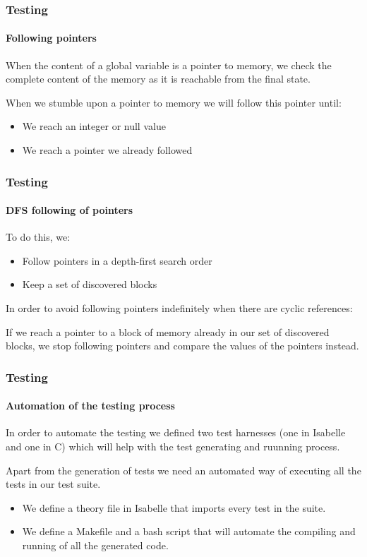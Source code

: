\begin{frame}
\frametitle{Testing}
\framesubtitle{Following pointers}

When the content of a global variable is a pointer to memory, we check the complete content of the memory as it is reachable from the final state.
\bigskip
\pause

When we stumble upon a pointer to memory we will follow this pointer until:
\begin{itemize}
\item{We reach an integer or null value}
\item{We reach a pointer we already followed}
\end{itemize}
\bigskip

\end{frame}


\begin{frame}
\frametitle{Testing}
\framesubtitle{DFS following of pointers}

To do this, we:
\begin{itemize}
\item{Follow pointers in a depth-first search order}
\item{Keep a set of discovered blocks}
\end{itemize}


In order to avoid following pointers indefinitely when there are cyclic references:

If we reach a pointer to a block of memory already in our set of discovered blocks, we stop following pointers and compare the values of the pointers instead.

\end{frame}


\begin{frame}
\frametitle{Testing}
\framesubtitle{Automation of the testing process}

In order to automate the testing we defined two test harnesses (one in Isabelle and one in C) which will help with the test generating and ruunning process.
\bigskip
\pause

Apart from the generation of tests we need an automated way of executing all the tests in our test suite.
\pause
\bigskip

\begin{itemize}
\item{We define a theory file in Isabelle that imports every test in the suite.}
\item{We define a Makefile and a bash script that will automate the compiling and running of all the generated code.}
\end{itemize}

\end{frame}
